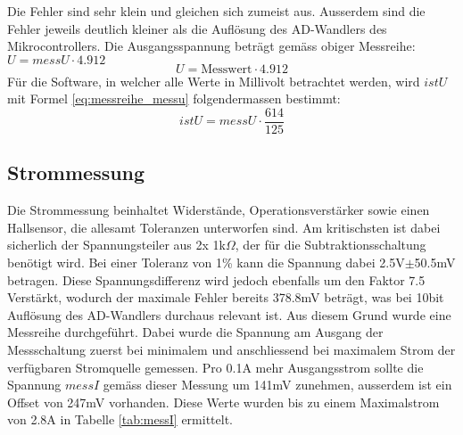 Die Fehler sind sehr klein und gleichen sich zumeist aus. Ausserdem sind die Fehler jeweils deutlich kleiner als die Auflösung des AD-Wandlers des Mikrocontrollers. Die Ausgangsspannung beträgt gemäss obiger Messreihe: $U=messU\cdot 4.912$
\begin{equation}
	U=\text{Messwert}\cdot 4.912
\label{eq:messreihe_messu}
\end{equation}
Für die Software, in welcher alle Werte in Millivolt betrachtet werden, wird $istU$ mit Formel \ref{eq:messreihe_messu} folgendermassen bestimmt:
\begin{equation}
	istU=messU\cdot\frac{614}{125}
\label{eq:messreihe_messu_sw}
\end{equation}


\subsection{Strommessung}\label{subsec_messi}
Die Strommessung beinhaltet Widerstände, Operationsverstärker sowie einen Hallsensor, die allesamt Toleranzen unterworfen sind. Am kritischsten ist dabei sicherlich der Spannungsteiler aus 2x 1k$\Omega$, der für die Subtraktionsschaltung benötigt wird. Bei einer Toleranz von 1\% kann die Spannung dabei 2.5V$\pm$50.5mV betragen. Diese Spannungsdifferenz wird jedoch ebenfalls um den Faktor 7.5 Verstärkt, wodurch der maximale Fehler bereits 378.8mV beträgt, was bei 10bit Auflösung des AD-Wandlers durchaus relevant ist. \newline
Aus diesem Grund wurde eine Messreihe durchgeführt. Dabei wurde die Spannung am Ausgang der Messschaltung zuerst bei minimalem und anschliessend bei maximalem Strom der verfügbaren Stromquelle gemessen. Pro 0.1A mehr Ausgangsstrom sollte die Spannung $messI$ gemäss dieser Messung um 141mV zunehmen, ausserdem ist ein Offset von 247mV vorhanden. Diese Werte wurden bis zu einem Maximalstrom von 2.8A in Tabelle \ref{tab:messI} ermittelt.
